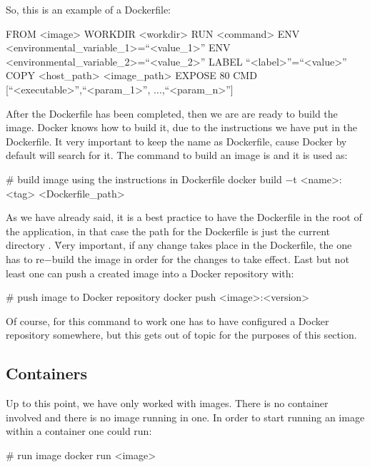 So, this is an example of a Dockerfile:

\begin{block}
FROM <image>
WORKDIR <workdir>
RUN <command>
ENV <environmental_variable_1>=``<value_1>''
ENV <environmental_variable_2>=``<value_2>''
LABEL ``<label>''=``<value>''
COPY <host_path> <image_path>
EXPOSE 80
CMD [``<executable>'',``<param_1>'', $\ldots$,``<param_n>'']
\end{block}

After the Dockerfile has been completed, then we are are ready to build the image. Docker knows how to build it, due
to the instructions we have put in the Dockerfile. It very important to keep the name as Dockerfile, cause Docker by
default will search for it. The command to build an image is  and it is used as:

\begin{bash}
# build image using the instructions in Dockerfile
docker build $-$t <name>:<tag> <Dockerfile_path>
\end{bash}

As we have already said, it is a best practice to have the Dockerfile in the root of the application, in that case
the path for the Dockerfile is just the current directory . \v

Very important, if any change takes place in the Dockerfile, the one has to re$-$build the image in order for the
changes to take effect. \v

Last but not least one can push a created image into a Docker repository with:

\begin{bash}
# push image to Docker repository
docker push <image>:<version>
\end{bash}

Of course, for this command to work one has to have configured a Docker repository somewhere, but this gets out of
topic for the purposes of this section.

\subsection{Containers}

Up to this point, we have only worked with images. There is no container involved and there is no image running in
one. In order to start running an image within a container one could run:

\begin{bash}
# run image
docker run <image>
\end{bash}

